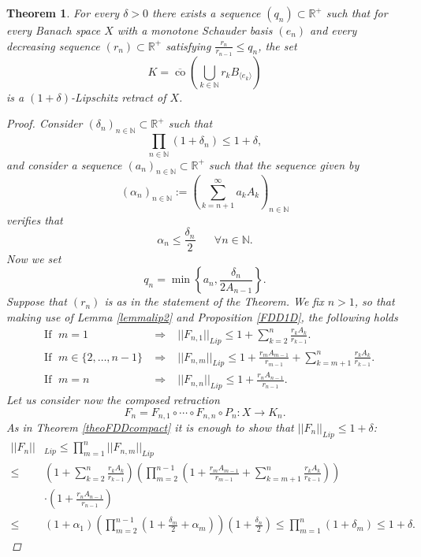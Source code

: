 \documentclass[11pt]{amsart}
\newcommand{\N}{\mathbb{N}}
\newcommand{\R}{\mathbb{R}}
\DeclareMathOperator{\co}{co}
\newcommand{\<}{\langle}
\renewcommand{\>}{\rangle}
\newtheorem{theorem}{Theorem}[section]
\theoremstyle{definition}
\theoremstyle{remark}
\numberwithin{equation}{section}
\def\R{{\mathbb R}}
\begin{document}
\begin{theorem}\label{SB}
For every $\delta>0$ there exists a sequence $(q_n)\subset \R^+$ such that for every Banach space $X$ with a monotone Schauder basis $(e_n)$ and every decreasing sequence $(r_n)\subset\R^+$ satisfying $\frac{r_n}{r_{n-1}}\le q_n$, the set
$$K=\overline{\co}\left(\bigcup\limits_{k\in\N}r_kB_{\langle e_k\rangle}\right)$$
is a $(1+\delta)$-Lipschitz retract of $X$.
\begin{proof}
Consider $(\delta_n)_{n\in\N}\subset\R^+$ such that
$$\prod\limits_{n\in\N}(1+\delta_n)\le 1+\delta,$$
and consider a sequence $(a_n)_{n\in\N}\subset\R^+$ such that the sequence given by
$$(\alpha_n)_{n\in\N}:=\left(\sum\limits_{k=n+1}^\infty a_kA_k\right)_{n\in\N}$$ verifies that
$$\alpha_n\le\frac{\delta_n}{2}\;\;\;\;\;\;\forall n\in\N.$$
Now we set
$$q_n=\min\left\{a_n,\frac{\delta_n}{2A_{n-1}}\right\}.$$
Suppose that $(r_n)$ is as in the statement of the Theorem. We fix $n>1$, so that making use of Lemma \ref{lemmalip2} and Proposition \ref{FDD1D}, the following holds
$$\begin{aligned}
&\text{If }\;m=1\;&\Rightarrow\; &||F_{n,1}||_{Lip}\le1+\sum\limits_{k=2}^n\frac{r_kA_k}{r_{k-1}}.\\
&\text{If }\;m\in\{2,\dots,n-1\}\;&\Rightarrow\; &||F_{n,m}||_{Lip}\le1+ \frac{r_mA_{m-1}}{r_{m-1}} +\sum\limits_{k=m+1}^n\frac{r_kA_k}{r_{k-1}}.\\
&\text{If }\;m=n\;&\Rightarrow\; &||F_{n,n}||_{Lip}\le1+ \frac{r_nA_{n-1}}{r_{n-1}}.
\end{aligned}$$
Let us consider now the composed retraction
$$F_n=F_{n,1}\circ\cdots\circ F_{n,n}\circ P_{n}:X\rightarrow K_n.$$
As in Theorem \ref{theoFDDcompact} it is enough to show that $||F_n||_{Lip}\le1+\delta$:
$$\begin{aligned}||F_n||&_{Lip}\le\prod\limits_{m=1}^n||F_{n,m}||_{Lip}\\
\le&\left( 1+\sum\limits_{k=2}^n\frac{r_kA_k}{r_{k-1}} \right)\left( \prod_{m=2}^{n-1} \left(1+ \frac{r_mA_{m-1}}{r_{m-1}} +\sum\limits_{k=m+1}^n\frac{r_kA_k}{r_{k-1}}\right) \right)\\
&\cdot\left( 1+ \frac{r_nA_{n-1}}{r_{n-1}} \right)\\
\le& (1+\alpha_1)\left(\prod\limits_{m=2}^{n-1}\left( 1+\frac{\delta_m}{2}+\alpha_m \right)\right)\left( 1+\frac{\delta_n}{2} \right)\le \prod\limits_{m=1}^n(1+\delta_m)\le1+\delta.\end{aligned}$$
\end{proof}
\end{theorem}
\end{document}
